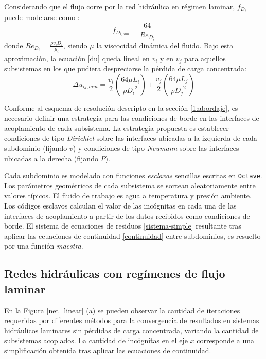 Considerando que el flujo corre por la red hidráulica en régimen laminar, $f_{D_i}$ puede modelarse como \cite{white}:
\begin{equation}
f_{D_{{i},lam}} = \frac{64}{Re_{D_i}}
\label{f-lam}
\end{equation}
donde $Re_{D_i}=\frac{\rho v_i D_i} {\mu_i}$, siendo $\mu$ la viscocidad dinámica del fluido.
Bajo esta aproximación, la ecuación \ref{du} queda lineal en $v_i$ y en $v_j$ para aquellos subsistemas en los que pudiera despreciarse la pérdida de carga concentrada:
\begin{equation}
\Delta u_{ij,lam} = \frac{{v_i}}{2} \left ( \frac{64 \mu L_{i}}{\rho {D_i}^{2}} \right ) + \frac{{v_j}}{2} \left ( \frac{64 \mu L_{j}}{\rho {D_j}^{2}} \right )
\label{du}
\end{equation}

Conforme al esquema de resolución descripto en la sección \ref{1:abordaje},
es necesario definir una estrategia para las condiciones de borde en las interfaces de acoplamiento de cada subsistema.
La estrategia propuesta es establecer condiciones de tipo \textit{Dirichlet} sobre las interfaces ubicadas a la izquierda de cada subdominio (fijando $v$)
y condiciones de tipo \textit{Neumann} sobre las interfaces ubicadas a la derecha (fijando $P$).

Cada subdominio es modelado con funciones \textit{esclavas} sencillas escritas en \texttt{Octave}.
Los parámetros geométricos de cada subsistema se sortean aleatoriamente entre valores típicos.
El fluido de trabajo es agua a temperatura y presión ambiente.
Los códigos esclavos calculan el valor de las incógnitas en cada una de las interfaces de acoplamiento a partir de los datos recibidos como condiciones de borde.
El sistema de ecuaciones de residuos \ref{sistema-simple} resultante tras aplicar las ecuaciones de continuidad \ref{continuidad} entre subdominios,
es resuelto por una función \textit{maestra}.

\subsection*{Redes hidráulicas con regímenes de flujo laminar}
\label{laminar}

En la Figura \ref{net_linear} (a) se pueden observar la cantidad de iteraciones requeridas por diferentes métodos para la convergencia de resultados
en sistemas hidráulicos laminares sin pérdidas de carga concentrada,
variando la cantidad de subsistemas acoplados.
La cantidad de incógnitas en el eje $x$ corresponde a una simplificación obtenida tras aplicar las ecuaciones de continuidad.

